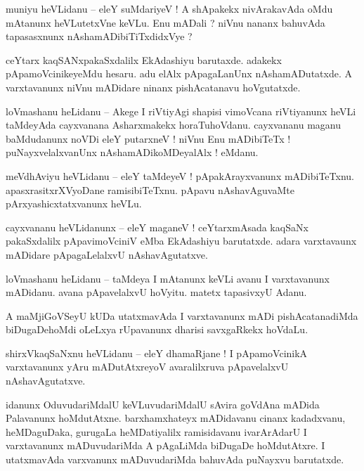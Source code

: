 \documentclass{article}
\begin{document}
\begin{mn}%
muniyu heVLidanu -- eleY suMdariyeV ! A shApakekx nivArakavAda oMdu mAtanunx heVLutetxVne keVLu. 
Enu mADali ? niVnu nananx bahuvAda tapasasxnunx nAshamADibiTiTxdidxVye ?
\end{mn}

\begin{mn}%
ceYtarx kaqSANxpakaSxdalilx EkAdashiyu barutaxde. adakekx pApamoVcinikeyeMdu hesaru. adu elAlx 
pApagaLanUnx nAshamADutatxde. A varxtavanunx niVnu mADidare ninanx pishAcatanavu hoVgutatxde.
\end{mn}

\begin{mn}%
loVmashanu heLidanu -- Akege I riVtiyAgi shapisi vimoVcana riVtiyanunx heVLi taMdeyAda cayxvanana 
Asharxmakekx horaTuhoVdanu. cayxvananu maganu baMdudanunx noVDi eleY putarxneV ! niVnu Enu 
mADibiTeTx ! puNayxvelalxvanUnx nAshamADikoMDeyalAlx ! eMdanu.
\end{mn}

\begin{mn}%
meVdhAviyu heVLidanu -- eleY taMdeyeV ! pApakArayxvanunx mADibiTeTxnu. apasxrasitxrXVyoDane 
ramisibiTeTxnu. pApavu nAshavAguvaMte pArxyashicxtatxvanunx heVLu.
\end{mn}

\begin{mn}%
cayxvananu heVLidanunx -- eleY maganeV ! ceYtarxmAsada kaqSaNx pakaSxdalilx pApavimoVciniV eMba 
EkAdashiyu barutatxde. adara varxtavaunx mADidare pApagaLelalxvU nAshavAgutatxve.
\end{mn}

\begin{mn}%
loVmashanu heLidanu -- taMdeya I mAtanunx keVLi avanu I varxtavanunx mADidanu. avana pApavelalxvU 
hoVyitu. matetx tapasivxyU Adanu.
\end{mn}

\begin{mn}%
A maMjiGoVSeyU kUDa utatxmavAda I varxtavanunx mADi pishAcatanadiMda  biDugaDehoMdi oLeLxya 
rUpavanunx dharisi savxgaRkekx hoVdaLu.
\end{mn}

\begin{mn}%
shirxVkaqSaNxnu heVLidanu -- eleY dhamaRjane ! I pApamoVcinikA varxtavanunx yAru mADutAtxreyoV 
avaralilxruva pApavelalxvU nAshavAgutatxve.
\end{mn}

\begin{mn}%
idanunx OduvudariMdalU keVLuvudariMdalU sAvira goVdAna mADida Palavanunx hoMdutAtxne. 
barxhamxhateyx mADidavanu cinanx kadadxvanu, heMDaguDaka, gurugaLa heMDatiyalilx ramisidavanu 
ivarArAdarU I varxtavanunx mADuvudariMda A pAgaLiMda biDugaDe hoMdutAtxre. I utatxmavAda 
varxvanunx mADuvudariMda bahuvAda puNayxvu barutatxde.
\end{mn}
\end{document}
